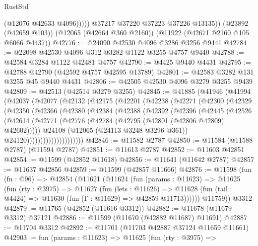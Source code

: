 \begin{lexlean}{RustStd}
\begin{coremodule}
                (@12076 @42633 @4096)))))
        @37217
        @37220
        @37223
        @37226
        @13135))
    (@23892 (@42659 @103))
    (@12065 (@42664 @360 @2160))
    (@11922 (@42671 @2160 @105 @6066 @4437))
@42776 := @24090 @42530 @4096 @3286 @3256 @9441
@42784 := @22098 @42530 @4096 @312 @3282 @1122 @3255 @4757 @9440
@42788 := @42584 @3284 @1122 @42481 @4757
@42790 := @4425 @9440 @4431
@42795 := @42788 @42790 (@42592 @4757 @42595 @13789)
@42801 := @42583 @3282 @131 @3255 @45 @9440 @4431
@42806 := @42505 @42530 @4096 @3279 @3255 @9439
@42809 := @42513 (@42514 @3279 @3255)
@42845 := @41885
    (@41946
      (@41994
        (@42037
          (@42077
            (@42132
              (@42175
                (@42201
                  (@42238
                    (@42271
                      (@42300
                        (@42329
                          (@42350
                            (@42366
                              (@42380
                                (@42384
                                  (@42388
                                    (@42392
                                      (@42396
                                        (@42445
                                          (@42526
                                            (@42614
                                              (@42771
                                                (@42776
                                                  (@42784
                                                    (@42795 (@42801 (@42806 @42809) @42602)))))
                                              @24108
                                              (@12065 (@24113 @3248 @3296 @361))
                                              @24120)))))))))))))))))))))
@42846 := @11582 @2787
@42850 := @11584 (@11588 @2787) (@11594 @2787)
@42851 := @11613 @2787
@42852 := @11603 @42851
@42854 := @11599 (@42852 @11618)
@42856 := @11641 (@11642 @2787)
@42857 := @11637 @42856
@42859 := @11599 (@42857 @11666)
@42876 := @11598
    (fun (fn : @96) =>
    @42854
      (@11621
        (@11624
          (fun (params : @11623) =>
          @11625
            (fun (rty : @3975) =>
            @11627
              (fun (lets : @11626) =>
              @11628 (fun (tail : @4424) => @11630 (fun (Γ : @11629) => @42859 @11713))))))
        @11759))
    @3312
@42879 := @11765 (@42852 (@11616 @3312))
@42882 := @11678 (@11679 @3312) @37121
@42886 := @11599 (@11670 (@42882 @11687) @11691)
@42887 := @11704 @3312
@42892 := @11701 (@11703 @42887 @37124 @11659 @11661)
@42903 := fun (params : @11623) =>
  @11625
    (fun (rty : @3975) =>

\end{coremodule}
\end{lexlean}
